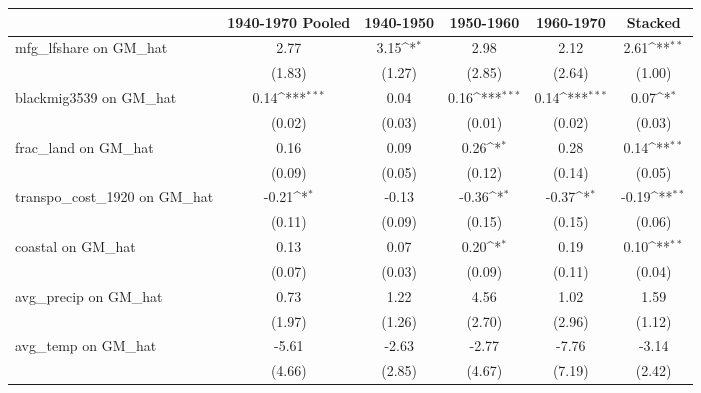 {
\def\sym#1{\ifmmode^{#1}\else\(^{#1}\)\fi}
\begin{tabular}{l*{5}{c}}
\toprule
                &\multicolumn{1}{c}{1940-1970 Pooled}&\multicolumn{1}{c}{1940-1950}&\multicolumn{1}{c}{1950-1960}&\multicolumn{1}{c}{1960-1970}&\multicolumn{1}{c}{Stacked}\\
\midrule
mfg\_lfshare on GM\_hat&     2.77         &     3.15\sym{*}  &     2.98         &     2.12         &     2.61\sym{**} \\
                &   (1.83)         &   (1.27)         &   (2.85)         &   (2.64)         &   (1.00)         \\
\addlinespace
blackmig3539 on GM\_hat&     0.14\sym{***}&     0.04         &     0.16\sym{***}&     0.14\sym{***}&     0.07\sym{*}  \\
                &   (0.02)         &   (0.03)         &   (0.01)         &   (0.02)         &   (0.03)         \\
\addlinespace
frac\_land on GM\_hat&     0.16         &     0.09         &     0.26\sym{*}  &     0.28         &     0.14\sym{**} \\
                &   (0.09)         &   (0.05)         &   (0.12)         &   (0.14)         &   (0.05)         \\
\addlinespace
transpo\_cost\_1920 on GM\_hat&    -0.21\sym{*}  &    -0.13         &    -0.36\sym{*}  &    -0.37\sym{*}  &    -0.19\sym{**} \\
                &   (0.11)         &   (0.09)         &   (0.15)         &   (0.15)         &   (0.06)         \\
\addlinespace
coastal on GM\_hat&     0.13         &     0.07         &     0.20\sym{*}  &     0.19         &     0.10\sym{**} \\
                &   (0.07)         &   (0.03)         &   (0.09)         &   (0.11)         &   (0.04)         \\
\addlinespace
avg\_precip on GM\_hat&     0.73         &     1.22         &     4.56         &     1.02         &     1.59         \\
                &   (1.97)         &   (1.26)         &   (2.70)         &   (2.96)         &   (1.12)         \\
\addlinespace
avg\_temp on GM\_hat&    -5.61         &    -2.63         &    -2.77         &    -7.76         &    -3.14         \\
                &   (4.66)         &   (2.85)         &   (4.67)         &   (7.19)         &   (2.42)         \\

\end{tabular}}
